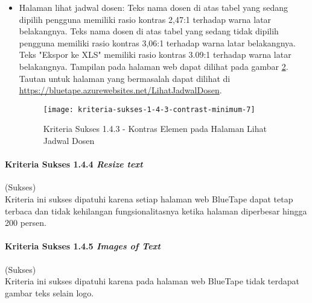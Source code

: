 \begin{itemize}
    \begin{figure}[H]
        \centering  
        \texttt{[image: kriteria-sukses-1-4-3-contrast-minimum-6-2]}  
        \caption[Kriteria Sukses 1.4.3 - Kontras Elemen pada Halaman Entri Jadwal Dosen (Gambar 2)]{Kriteria Sukses 1.4.3 - Kontras Elemen pada Halaman Entri Jadwal Dosen (Gambar 2)}
        \label{fig:1.4.3_contrast_minimum_6_2}  
    \end{figure} 

    \item Halaman lihat jadwal dosen: Teks nama dosen di atas tabel yang sedang dipilih pengguna memiliki rasio kontras 2,47:1 terhadap warna latar belakangnya. Teks nama dosen di atas tabel yang sedang tidak dipilih pengguna memiliki rasio kontras 3,06:1 terhadap warna latar belakangnya. Teks "Ekspor ke XLS" memiliki rasio kontras 3.09:1 terhadap warna latar belakangnya. Tampilan pada halaman web dapat dilihat pada gambar \ref{fig:1.4.3_contrast_minimum_7}. Tautan untuk halaman yang bermasalah dapat dilihat di \url{https://bluetape.azurewebsites.net/LihatJadwalDosen}.
    \begin{figure}[H]
        \centering  
        \texttt{[image: kriteria-sukses-1-4-3-contrast-minimum-7]}  
        \caption[Kriteria Sukses 1.4.3 - Kontras Elemen pada Halaman Lihat Jadwal Dosen]{Kriteria Sukses 1.4.3 - Kontras Elemen pada Halaman Lihat Jadwal Dosen}
        \label{fig:1.4.3_contrast_minimum_7}  
    \end{figure} 
\end{itemize}

\paragraph{Kriteria Sukses 1.4.4 \textit{Resize text}}
\label{par:kepatuhan_bluetape_kriteria_sukses_1.4.4}
(Sukses)\\

Kriteria ini sukses dipatuhi karena setiap halaman web BlueTape dapat tetap terbaca dan tidak kehilangan fungsionalitasnya ketika halaman diperbesar hingga 200 persen. 

\paragraph{Kriteria Sukses 1.4.5 \textit{Images of Text}}
\label{par:kepatuhan_bluetape_kriteria_sukses_1.4.5}
(Sukses)\\

Kriteria ini sukses dipatuhi karena pada halaman web BlueTape tidak terdapat gambar teks selain logo.

